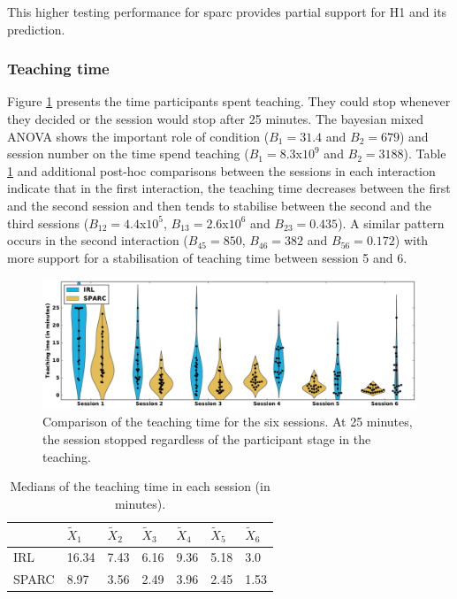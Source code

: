 This higher testing performance for \gls{sparc} provides partial support for H1 and its prediction.

\subsubsection{Teaching time}

Figure \ref{fig:control_time} presents the time participants spent teaching. They could stop whenever they decided or the  session would stop after 25 minutes. The bayesian mixed ANOVA shows the important role of condition ($B_1=31.4$ and $B_2 = 679$) and session number on the time spend teaching ($B_1=8.3$x$10^9$ and $B_2 = 3188$). Table \ref{tab:control_time} and additional post-hoc comparisons between the sessions in each interaction indicate that in the first interaction, the teaching time decreases between the first and the second session and then tends to stabilise between the second and the third sessions ($B_{12}=4.4$x$10^5$, $B_{13}=2.6$x$10^6$ and $B_{23}=0.435$). A similar pattern occurs in the second interaction ($B_{45}=850$, $B_{46}=382$ and $B_{56}=0.172$) with more support for a stabilisation of teaching time between session 5 and 6.

\begin{figure}[ht]
	\includegraphics[width=\textwidth]{time.pdf}
	\centering
	\caption{Comparison of the teaching time for the six sessions. At 25 minutes, the session stopped regardless of the participant stage in the teaching.
	}
	\label{fig:control_time}
\end{figure}

\begin{table}[ht]
	\centering
	\caption{Medians of the teaching time in each session (in minutes).}
	\label{tab:control_time}
	\begin{tabular}{@{}lllllll@{}}\toprule
		& $\widetilde{X}_{1}$ & $\widetilde{X}_{2}$ & $\widetilde{X}_{3}$ & $\widetilde{X}_{4}$ & $\widetilde{X}_{5}$ & $\widetilde{X}_{6}$\\ 
		\midrule
    IRL & 16.34 & 7.43 & 6.16 & 9.36 & 5.18 & 3.0\\
    SPARC & 8.97 & 3.56 & 2.49 & 3.96 & 2.45 & 1.53\\
    \bottomrule
	\end{tabular}
\end{table}

